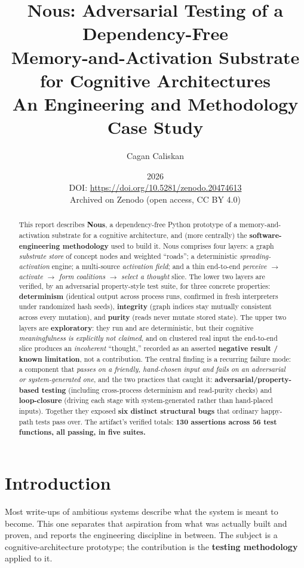 \documentclass[11pt]{article}
\title{\textbf{Nous: Adversarial Testing of a Dependency-Free\\
Memory-and-Activation Substrate for Cognitive Architectures}\\[4pt]
\large An Engineering and Methodology Case Study}
\author{Cagan Caliskan}
\date{2026\\[6pt]
{\normalsize DOI: \url{https://doi.org/10.5281/zenodo.20474613}}\\
{\normalsize Archived on Zenodo (open access, CC BY 4.0)}}
\begin{document}
\maketitle

\begin{abstract}
\noindent
This report describes \textbf{Nous}, a dependency-free Python prototype of a memory-and-activation
substrate for a cognitive architecture, and (more centrally) the \textbf{software-engineering
methodology} used to build it. Nous comprises four layers: a graph \emph{substrate store} of concept
nodes and weighted ``roads''; a deterministic \emph{spreading-activation} engine; a multi-source
\emph{activation field}; and a thin end-to-end \emph{perceive $\rightarrow$ activate $\rightarrow$ form
coalitions $\rightarrow$ select a thought} slice. The lower two layers are verified, by an adversarial
property-style test suite, for three concrete properties: \textbf{determinism} (identical output across
process runs, confirmed in fresh interpreters under randomized hash seeds), \textbf{integrity} (graph
indices stay mutually consistent across every mutation), and \textbf{purity} (reads never mutate stored
state). The upper two layers are \textbf{exploratory}: they run and are deterministic, but their
cognitive \emph{meaningfulness is explicitly not claimed}, and on clustered real input the end-to-end
slice produces an \emph{incoherent} ``thought,'' recorded as an asserted \textbf{negative result /
known limitation}, not a contribution. The central finding is a recurring failure mode: a component
that \emph{passes on a friendly, hand-chosen input and fails on an adversarial or system-generated
one}, and the two practices that caught it: \textbf{adversarial/property-based testing} (including
cross-process determinism and read-purity checks) and \textbf{loop-closure} (driving each stage with
system-generated rather than hand-placed inputs). Together they exposed \textbf{six distinct structural
bugs} that ordinary happy-path tests pass over. The artifact's verified totals: \textbf{130 assertions
across 56 test functions, all passing, in five suites.}
\end{abstract}

\section{Introduction}

Most write-ups of ambitious systems describe what the system is meant to become. This one separates
that aspiration from what was actually built and proven, and reports the engineering discipline in
between. The subject is a cognitive-architecture prototype; the contribution is the \textbf{testing
methodology} applied to it.
\end{document}
